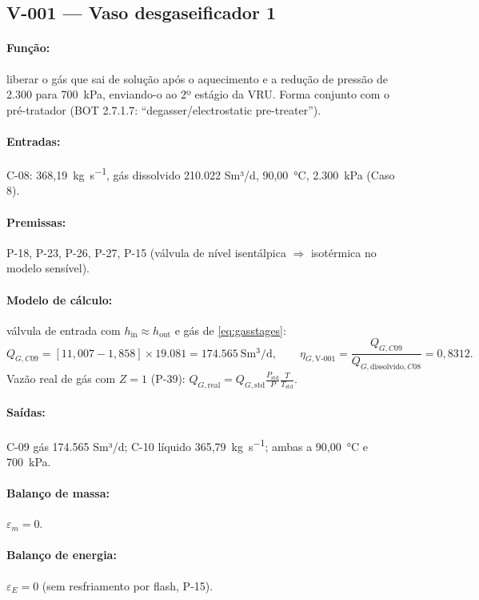 \documentclass[11pt,a4paper]{article}
\numberwithin{equation}{section}
\numberwithin{table}{section}
\numberwithin{figure}{section}
\begin{document}
\subsection{V-001 --- Vaso desgaseificador 1}
\paragraph{Função:} liberar o gás que sai de solução após o aquecimento e a redução de pressão de 2.300 para 700~\si{\kilo\pascal}, enviando-o ao 2º estágio da VRU. Forma conjunto com o pré-tratador (BOT 2.7.1.7: ``degasser/electrostatic pre-treater'').
\paragraph{Entradas:} C-08: 368,19~\si{\kilogram\per\second}, gás dissolvido 210.022 Sm³/d, 90,00~\si{\celsius}, 2.300~\si{\kilo\pascal} (Caso 8).
\paragraph{Premissas:} P-18, P-23, P-26, P-27, P-15 (válvula de nível isentálpica $\Rightarrow$ isotérmica no modelo sensível).
\paragraph{Modelo de cálculo:} válvula de entrada com $h_{\mathrm{in}}\approx h_{\mathrm{out}}$ e gás de \eqref{eq:gasstages}:
\begin{equation}
Q_{G,C09}=\left[11{,}007-1{,}858\right]\times19.081=174.565\ \mathrm{Sm^3/d},\qquad \eta_{G,\mbox{V-001}}=\frac{Q_{G,C09}}{Q_{G,\mathrm{dissolvido},C08}}=0{,}8312.
\end{equation}
Vazão real de gás com $Z=1$ (P-39): $Q_{G,\mathrm{real}}=Q_{G,\mathrm{std}}\frac{P_{\mathrm{std}}}{P}\frac{T}{T_{\mathrm{std}}}$.

\paragraph{Saídas:} C-09 gás 174.565 Sm³/d; C-10 líquido 365,79~\si{\kilogram\per\second}; ambas a 90,00~\si{\celsius} e 700~\si{\kilo\pascal}.
\paragraph{Balanço de massa:} $\varepsilon_m=$$0$.
\paragraph{Balanço de energia:} $\varepsilon_E=$$0$ (sem resfriamento por flash, P-15).
\end{document}
